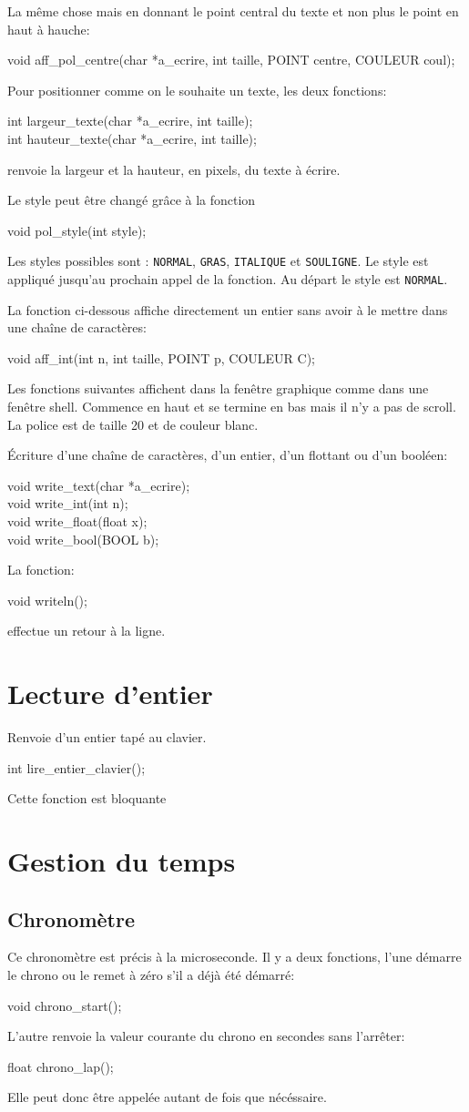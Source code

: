 \documentclass{report}
\newcommand\code[1]{
\begin{mdframed}[linecolor=purple,backgroundcolor=blue!10]
{\tt
#1
}
\end{mdframed}
}
\begin{document}
La même chose mais en donnant le point central du texte et non plus
le point en haut à hauche:
\code{
void aff\_pol\_centre(char *a\_ecrire, int taille, POINT centre, COULEUR coul);
}

Pour positionner comme on le souhaite un texte, les deux fonctions:
\code{
int largeur\_texte(char *a\_ecrire, int taille);\\
int hauteur\_texte(char *a\_ecrire, int taille);
}
renvoie la largeur et la hauteur, en pixels, du texte à écrire.

Le style peut être changé grâce à la fonction
\code{
void pol\_style(int style);
}
Les styles possibles sont : \texttt{NORMAL}, \texttt{GRAS}, \texttt{ITALIQUE} et 
\texttt{SOULIGNE}. Le style est appliqué jusqu'au prochain appel de la fonction.
Au départ le style est \texttt{NORMAL}.

La fonction ci-dessous affiche directement un entier sans avoir 
à le mettre dans une chaîne de caractères:
\code{
void aff\_int(int n, int taille, POINT p, COULEUR C);
}

Les fonctions suivantes affichent dans la fenêtre graphique comme dans 
une fenêtre shell. Commence en haut et se termine en bas mais il n'y a
pas de scroll. La police est de taille 20 et de couleur blanc.

\'Ecriture d'une chaîne de caractères, d'un entier, d'un flottant ou d'un booléen:
\code{
void write\_text(char *a\_ecrire);\\
void write\_int(int n);\\
void write\_float(float x);\\
void write\_bool(BOOL b);
}

La fonction:
\code{
void writeln();
}
effectue un retour à la ligne.

\section{Lecture d'entier}
Renvoie d'un entier tapé au clavier. 
\code{
int lire\_entier\_clavier();
}
Cette fonction est bloquante


\section{Gestion du temps}

\subsection{Chronomètre}
Ce chronomètre est précis à la microseconde.
Il y a deux fonctions, l'une démarre le chrono ou le remet à zéro s'il a déjà été démarré:
\code{
void chrono\_start();
}
L'autre renvoie la valeur courante du chrono en secondes sans l'arrêter:
\code{
float chrono\_lap();
}
Elle peut donc être appelée autant de fois que nécéssaire.
\end{document}
